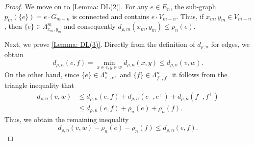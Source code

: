 \documentclass{amsart}
\numberwithin{equation}{section}
\theoremstyle{definition}
\theoremstyle{remark}
\begin{document}
\begin{proof}
    We move on to \ref{Lemma: DL(2)}. For any \(e\in E_n\), the sub-graph \(p_{m}(\{e\})=e\cdot G_{m-n}\) is connected and contains \(e\cdot V_{m-n}\). Thus, if \(x_m,y_m\in V_{m-n}\), then \(\{e\}\in\Lambda^m_{x_m,y_m}\) and consequently
        \(
            d_{\rho,m}(x_m,y_m)\leq \rho_n(e).
        \)
    \vspace{5pt}
    
    Next, we prove \ref{Lemma: DL(3)}. Directly from the definition of \(d_{\rho,n}\) for edges, we obtain
        \[
            d_{\rho,n}(e,f)=\min_{x\in e,y\in w}d_{\rho,n}(x,y)\leq d_{\rho,n}(v,w).
        \]
    On the other hand, since \(\{e\}\in\Lambda^n_{e^-,e^+}\) and \(\{f\}\in\Lambda^n_{f^-,f^+}\) it follows from the triangle inequality that
        \[
        \begin{split}
         d_{\rho,n}(v,w) &\leq d_{\rho,n}(e,f) + d_{\rho,n}(e^-,e^+) + d_{\rho,n}(f^-,f^+)\\
         &\leq d_{\rho,n}(e,f) + \rho_n(e) + \rho_n(f).
         \end{split}
        \]
    Thus, we obtain the remaining inequality
        \[
            d_{\rho,n}(v,w)-\rho_n(e)-\rho_n(f)\leq d_{\rho,n}(e,f).
        \]


\end{proof}
\end{document}
